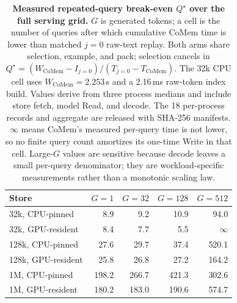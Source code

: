 \begin{table}[t]
\centering
\scriptsize
\setlength{\tabcolsep}{5pt}
\begin{tabular}{@{}lrrrr@{}}
\toprule
\textbf{Store} & \textbf{$G{=}1$} & \textbf{$G{=}32$} &
\textbf{$G{=}128$} & \textbf{$G{=}512$} \\
\midrule
32k, CPU-pinned & 8.9 & 9.2 & 10.9 & 94.0 \\
32k, GPU-resident & 8.4 & 7.7 & 5.5 & $\infty$ \\
128k, CPU-pinned & 27.6 & 29.7 & 37.4 & 520.1 \\
128k, GPU-resident & 25.8 & 26.8 & 27.2 & 164.2 \\
1M, CPU-pinned & 198.2 & 266.7 & 421.3 & 302.6 \\
1M, GPU-resident & 180.2 & 183.0 & 190.6 & 574.7 \\
\bottomrule
\end{tabular}
\caption{\textbf{Measured repeated-query break-even $Q^\star$ over the full
serving grid.}
$G$ is generated tokens; a cell is the number of queries after which cumulative
CoMem time is lower than matched $j{=}0$ raw-text replay. Both arms share
selection, example, and pack; selection cancels in
$Q^\star=(W_{\mathrm{CoMem}}-I_{j=0})/
(T_{j=0}-T_{\mathrm{CoMem}})$. The 32k CPU cell uses
$W_{\mathrm{CoMem}}{=}2.253$\,s and a 2.16\,ms raw-token index build.
Values derive from three process medians and include store fetch, model Read,
and decode. The 18 per-process records and aggregate are released with
SHA-256 manifests. $\infty$ means CoMem's measured per-query time is not
lower, so no finite query count amortizes its one-time Write in that cell.
Large-$G$ values are sensitive because decode leaves a small per-query
denominator; they are workload-specific measurements rather than a monotonic
scaling law.}
\label{tab:serving-crossover}
\end{table}
